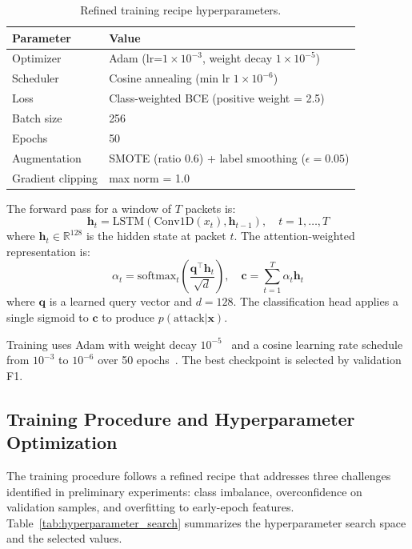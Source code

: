 \documentclass[sensors,apajournal,article,submit,moreauthors]{Definitions/mdpi}
\begin{document}
\begin{table}[H]
\caption{Refined training recipe hyperparameters.}
\label{tab:hyperparameters}
\begin{tabular}{p{} p{}}
\toprule
\textbf{Parameter} & \textbf{Value}\\
\midrule
Optimizer & Adam (lr=$1\times10^{-3}$, weight decay $1\times10^{-5}$)\\
Scheduler & Cosine annealing (min lr $1\times10^{-6}$)\\
Loss & Class-weighted BCE (positive weight = 2.5)\\
Batch size & 256\\
Epochs & 50\\
Augmentation & SMOTE (ratio 0.6) + label smoothing ($\epsilon = 0.05$)\\
Gradient clipping & max norm = 1.0\\
\bottomrule
\end{tabular}
\end{table}

The forward pass for a window of $T$ packets is:
\begin{equation}
\mathbf{h}_t = \mathrm{LSTM}(\mathrm{Conv1D}(x_t), \mathbf{h}_{t-1}), \quad t = 1, \ldots, T
\end{equation}
where $\mathbf{h}_t \in \mathbb{R}^{128}$ is the hidden state at packet $t$. The attention-weighted representation is:
\begin{equation}
\alpha_t = \mathrm{softmax}_t\!\left(\frac{\mathbf{q}^{\top} \mathbf{h}_t}{\sqrt{d}}\right), \quad
\mathbf{c} = \sum_{t=1}^{T} \alpha_t \mathbf{h}_t
\end{equation}
where $\mathbf{q}$ is a learned query vector and $d=128$. The classification head applies a single sigmoid to $\mathbf{c}$ to produce $p(\mathrm{attack}|\mathbf{x})$.

Training uses Adam with weight decay $10^{-5}$~\citep{loshchilov2017adamw} and a cosine learning rate schedule from $10^{-3}$ to $10^{-6}$ over 50 epochs~\citep{chollet2017xception}. The best checkpoint is selected by validation F1.

\subsection{Training Procedure and Hyperparameter Optimization}

The training procedure follows a refined recipe that addresses three challenges identified in preliminary experiments: class imbalance, overconfidence on validation samples, and overfitting to early-epoch features. Table~\ref{tab:hyperparameter_search} summarizes the hyperparameter search space and the selected values.
\end{document}
